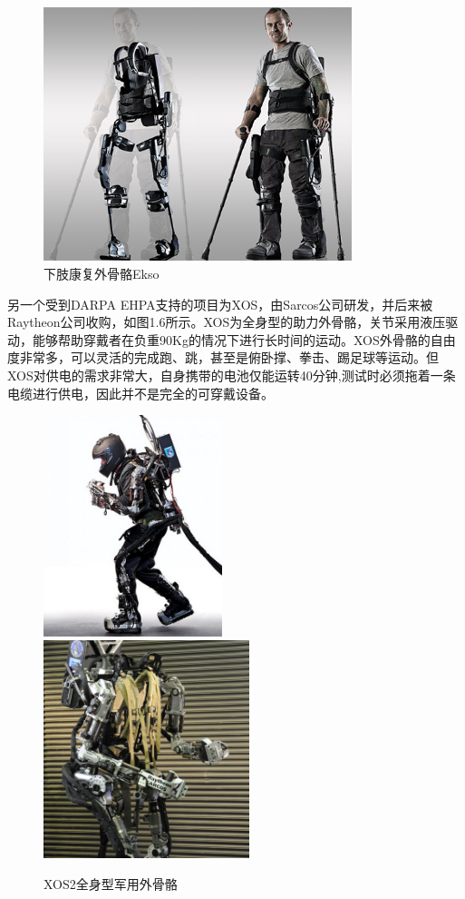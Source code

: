 \begin{figure}[!htb]
    \includegraphics[width=9cm]{fig/f9_ekso.jpg}
    \caption{下肢康复外骨骼Ekso\cite{p9}}
    \label{fig:mark}
\end{figure}

另一个受到DARPA EHPA支持的项目为XOS\cite{p8}，由Sarcos公司研发，并后来被Raytheon公司收购，如图1.6所示。XOS为全身型的助力外骨骼，关节采用液压驱动，能够帮助穿戴者在负重90Kg的情况下进行长时间的运动。XOS外骨骼的自由度非常多，可以灵活的完成跑、跳，甚至是俯卧撑、拳击、踢足球等运动。但XOS对供电的需求非常大，自身携带的电池仅能运转40分钟,测试时必须拖着一条电缆进行供电，因此并不是完全的可穿戴设备。

\begin{figure}[htb]
    \label{fig:sub1}{\includegraphics[width=5.2cm]{fig/f6_XOS.jpg}}\quad
    \label{fig:sub2}{\includegraphics[width=6cm]{fig/f7_XOS.jpg}}
    \caption{XOS2全身型军用外骨骼\cite{p8}}
    \label{fig:subfigs}
\end{figure}

